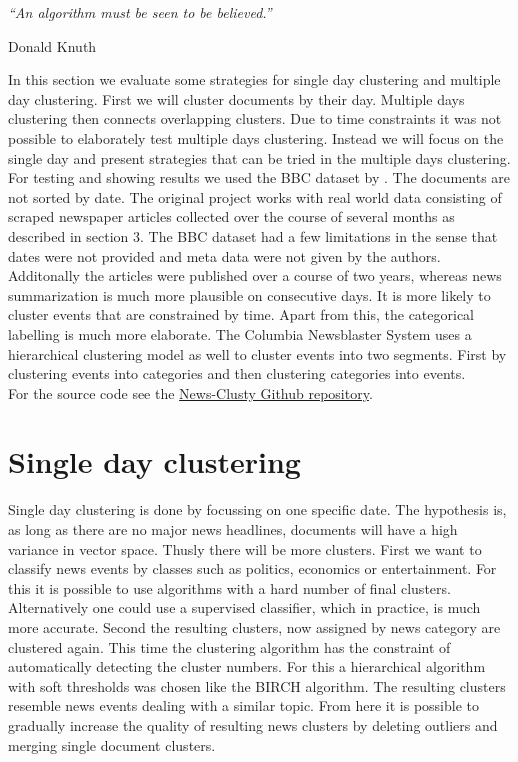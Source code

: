 \epigraph{\emph{
  ``An algorithm must be seen to be believed.''
}}{ Donald Knuth }

In this section we evaluate some strategies for single day clustering and multiple day clustering. First we will cluster documents by their day. Multiple days clustering then connects overlapping clusters. Due to time constraints it was not possible to elaborately test multiple days clustering. Instead we will focus on the single day and present strategies that can be tried in the multiple days clustering.\\
For testing and showing results we used the BBC dataset by \cite{BBCData2006}. The documents are not sorted by date. The original project works with real world data consisting of scraped newspaper articles collected over the course of several months as described in section 3. The BBC dataset had a few limitations in the sense that dates were not provided and meta data were not given by the authors. Additonally the articles were published over a course of two years, whereas news summarization is much more plausible on consecutive days. It is more likely to cluster events that are constrained by time. Apart from this, the categorical labelling is much more elaborate. The Columbia Newsblaster System uses a hierarchical clustering model as well to cluster events into two segments. First by clustering events into categories and then clustering categories into events.\\
For the source code see the \href{https://github.com/sacry-/text-mining-haw-bachelor/}{News-Clusty Github repository}.

\section{Single day clustering}

Single day clustering is done by focussing on one specific date. The hypothesis is, as long as there are no major news headlines, documents will have a high variance in vector space. Thusly there will be more clusters. First we want to classify news events by classes such as politics, economics or entertainment. For this it is possible to use algorithms with a hard number of final clusters. Alternatively one could use a supervised classifier, which in practice, is much more accurate. Second the resulting clusters, now assigned by news category are clustered again. This time the clustering algorithm has the constraint of automatically detecting the cluster numbers. For this a hierarchical algorithm with soft thresholds was chosen like the BIRCH algorithm. The resulting clusters resemble news events dealing with a similar topic. From here it is possible to gradually increase the quality of resulting news clusters by deleting outliers and merging single document clusters.

